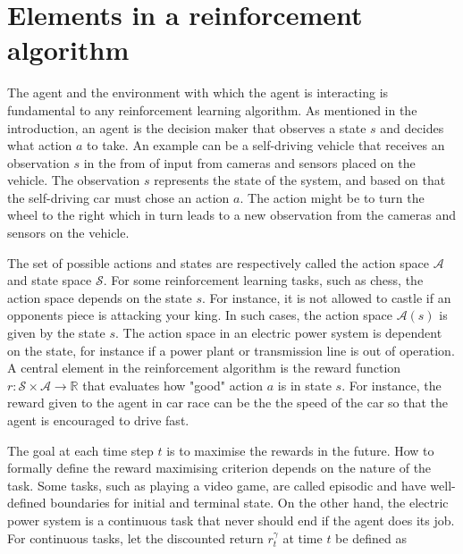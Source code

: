 \documentclass[class=book, crop=false, 11pt]{standalone}
\begin{document}
\section{Elements in a reinforcement algorithm}

The agent and the environment with which the agent is interacting is fundamental to any reinforcement learning algorithm. As mentioned in the introduction, an agent is the decision maker that observes a state $s$ and decides what action $a$ to take. An example can be a self-driving vehicle that receives an observation $s$ in the from of input from cameras and sensors placed on the vehicle. The observation $s$ represents the state of the system, and based on that the self-driving car must chose an action $a$. The action might be to turn the wheel to the right which in turn leads to a new observation from the cameras and sensors on the vehicle.

The set of possible actions and states are respectively called the action space $\mathcal{A}$ and state space $\mathcal{S}$. For some reinforcement learning tasks, such as chess, the action space depends on the state $s$. For instance, it is not allowed to castle if an opponents piece is attacking your king. In such cases, the action space $\mathcal{A}(s)$ is given by the state $s$. The action space in an electric power system is dependent on the state, for instance if a power plant or transmission line is out of operation. A central element in the reinforcement algorithm is the reward function $r: \mathcal{S} \times \mathcal{A} \to \mathbb{R}$ that evaluates how "good" action $a$ is in state $s$. For instance, the reward given to the agent in car race can be the the speed of the car so that the agent is encouraged to drive fast.

The goal at each time step $t$ is to maximise the rewards in the future. How to formally define the reward maximising criterion depends on the nature of the task. Some tasks, such as playing a video game, are called episodic and have well-defined boundaries for initial and terminal state. On the other hand, the electric power system is a continuous task that never should end if the agent does its job. For continuous tasks, let the discounted return $r^{\gamma}_{t}$ at time $t$ be defined as 
\end{document}
